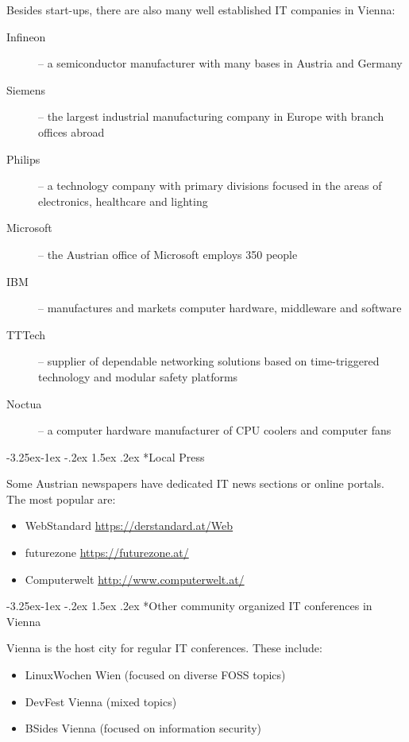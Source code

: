 \documentclass[10pt,a4paper]{article}
\makeatletter
\renewcommand\subsection{%
\@startsection{subsection}{2}{\z@}%
              {-3.25ex\@plus -1ex \@minus -.2ex}%
              {1.5ex \@plus .2ex}%
              {\color{kdelight}\sffamily\Large\bfseries}}
\makeatother
\begin{document}
Besides start-ups, there are also many well established IT companies in Vienna:
\begin{description}
	\item[\color{kdedarker} Infineon] -- a semiconductor manufacturer with many bases in Austria and Germany
	\item[\color{kdedarker} Siemens] -- the largest industrial manufacturing company in Europe with branch offices abroad
	\item[\color{kdedarker} Philips] -- a technology company with primary divisions focused in the areas of electronics, healthcare and lighting
	\item[\color{kdedarker} Microsoft] -- the Austrian office of Microsoft employs 350 people
	\item[\color{kdedarker} IBM] -- manufactures and markets computer hardware, middleware and software
	\item[\color{kdedarker} TTTech] -- supplier of dependable networking solutions based on time-triggered technology and modular safety platforms
	\item[\color{kdedarker} Noctua] -- a computer hardware manufacturer of CPU coolers and computer fans 
\end{description}

\subsection*{Local Press}
Some Austrian newspapers have dedicated IT news sections or online portals. The most popular are:

\begin{itemize}
\item WebStandard \url{https://derstandard.at/Web}
\item futurezone \url{https://futurezone.at/}
\item Computerwelt \url{http://www.computerwelt.at/}
\end{itemize}


\subsection*{Other community organized IT conferences in Vienna}
Vienna is the host city for regular IT conferences. These include:

\begin{itemize}
	\item LinuxWochen Wien (focused on diverse FOSS topics)
	\item DevFest Vienna (mixed topics)
	\item BSides Vienna (focused on information security)
\end{itemize}
\end{document}

